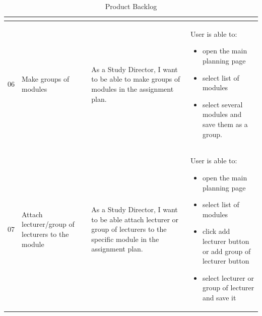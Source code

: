 \documentclass{scrartcl}
\begin{document}
\begin{table}[H]
\begin{center}
\begin{tabular}{|p{0.5cm} |p{3cm}|p{5.5cm}|p{5.5cm}|}
\begin{itemize}
\end{itemize}                                                                 \\ \hline

 
 06&
 Make groups of modules&
 As a Study Director, I want to be able to make groups of modules in the assignment plan. &
 
   User is able to:            
\begin{itemize}
\item open the main planning page
\item select list of modules
\item select several modules and save them as a group.
\end{itemize}       \\ \hline

 
 07&
 Attach lecturer/group of lecturers to the module&
 As a Study Director, I want to be able attach lecturer or group of lecturers to the specific module in the assignment plan. &
 
   User is able to:            
\begin{itemize}
\item open the main planning page
\item select list of modules 
\item click add lecturer button or add group of lecturer button
\item select lecturer or group of lecturer and save it


\end{itemize}                                                             

  
\end{tabular}
\end{center}
\caption{Product Backlog}
\label{table2}
\end{table}

\pagebreak                                                            
\end{document}
